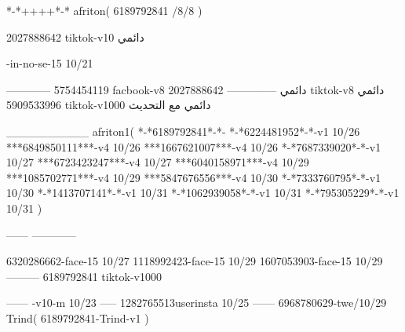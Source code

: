 *-*++++*-*
afriton(
6189792841 /8/8
)

2027888642 tiktok-v10
دائمي


-in-no-se-15 10/21

------------
5754454119 facbook-v8
دائمي
--------------
2027888642 tiktok-v8
دائمي
5909533996 tiktok-v1000
دائمي مع التحديث

__________
afriton1(
*-*6189792841*-*-
*-*6224481952*-*-v1 10/26
***6849850111***-v4 10/26
***1667621007***-v4 10/26
*-*7687339020*-*-v1 10/27
***6723423247***-v4 10/27
***6040158971***-v4 10/29
***1085702771***-v4 10/29
***5847676556***-v4 10/30
*-*7333760795*-*-v1 10/30
*-*1413707141*-*-v1 10/31
*-*1062939058*-*-v1 10/31
*-*795305229*-*-v1 10/31
)

------
------------


6320286662-face-15 10/27
1118992423-face-15 10/29
1607053903-face-15 10/29
---------
6189792841 tiktok-v1000

------
-v10-m 10/23
-----
1282765513userinsta 10/25
------
6968780629-twe/10/29
Trind(
6189792841-Trind-v1 
)
